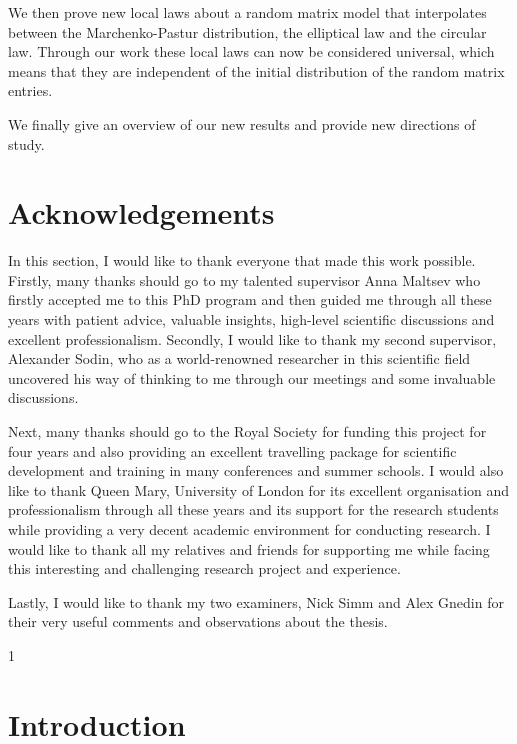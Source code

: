 \documentclass[11pt, a4paper, oneside]{book}
\numberwithin{equation}{chapter}
\begin{document}
We then prove new local laws about a random matrix model that interpolates between the Marchenko-Pastur distribution, the elliptical law and the circular law. Through our work these local laws can now be considered universal, which means that they are independent of the initial distribution of the random matrix entries.

We finally give an overview of our new results and provide new directions of study.

\chapter*{Acknowledgements}
\label{C:Acknowledgements}

In this section, I would like to thank everyone that made this work possible. Firstly, many thanks should go to my talented supervisor Anna Maltsev who firstly accepted me to this PhD program and then guided me through all these years with patient advice, valuable insights, high-level scientific discussions and excellent professionalism. Secondly, I would like to thank my second supervisor, Alexander Sodin, who as a world-renowned researcher in this scientific field uncovered his way of thinking to me through our meetings and some invaluable discussions. 

Next, many thanks should go to the Royal Society for funding this project for four years and also providing an excellent travelling package for scientific development and training in many conferences and summer schools. I would also like to thank Queen Mary, University of London for its excellent organisation and professionalism through all these years and its support for the research students while providing a very decent academic environment for conducting research. I would like to thank all my relatives and friends for supporting me while facing this interesting and challenging research project and experience. 

Lastly, I would like to thank my two examiners, Nick Simm and Alex Gnedin for their very useful comments and observations about the thesis.
\begin{spacing}{1}
\tableofcontents
\end{spacing} 
\chapter{Introduction}
\end{document}
